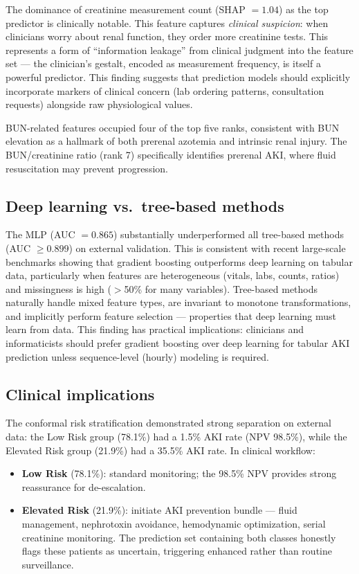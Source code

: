 \documentclass[12pt]{article}
\begin{document}
The dominance of creatinine measurement count
(SHAP $= 1.04$) as the top predictor is clinically notable.
This feature captures \textit{clinical suspicion}: when clinicians
worry about renal function, they order more creatinine tests.
This represents a form of ``information leakage'' from clinical
judgment into the feature set --- the clinician's gestalt, encoded
as measurement frequency, is itself a powerful predictor.  This
finding suggests that prediction models should explicitly
incorporate markers of clinical concern (lab ordering patterns,
consultation requests) alongside raw physiological values.

BUN-related features occupied four of the top five ranks,
consistent with BUN elevation as a hallmark of both prerenal
azotemia and intrinsic renal injury.  The BUN/creatinine ratio
(rank 7) specifically identifies prerenal AKI, where fluid
resuscitation may prevent progression.

\subsection{Deep learning vs.\ tree-based methods}

The MLP (AUC $= 0.865$) substantially underperformed all
tree-based methods (AUC $\geq 0.899$) on external validation.
This is consistent with recent large-scale benchmarks showing
that gradient boosting outperforms deep learning on tabular
data,\cite{grinsztajn2022tree} particularly when features are
heterogeneous (vitals, labs, counts, ratios) and missingness is
high ($>$50\% for many variables).  Tree-based methods naturally
handle mixed feature types, are invariant to monotone
transformations, and implicitly perform feature selection ---
properties that deep learning must learn from data.  This finding
has practical implications: clinicians and informaticists should
prefer gradient boosting over deep learning for tabular AKI
prediction unless sequence-level (hourly) modeling is required.

\subsection{Clinical implications}

The conformal risk stratification demonstrated strong separation
on external data: the Low Risk group (78.1\%) had a 1.5\% AKI
rate (NPV 98.5\%), while the Elevated Risk group (21.9\%) had a
35.5\% AKI rate.  In clinical workflow:
\begin{itemize}
\item \textbf{Low Risk} (78.1\%): standard monitoring; the 98.5\%
NPV provides strong reassurance for de-escalation.
\item \textbf{Elevated Risk} (21.9\%): initiate AKI prevention
bundle --- fluid management, nephrotoxin avoidance, hemodynamic
optimization, serial creatinine
monitoring.\cite{meersch2017prevention}  The prediction set
containing both classes honestly flags these patients as
uncertain, triggering enhanced rather than routine surveillance.
\end{itemize}
\end{document}
